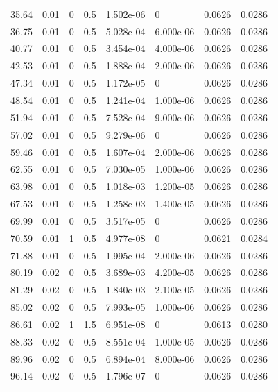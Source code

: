 \documentclass[preview]{standalone}
\begin{document}
{{\begin{tabular}{L{1.2cm}C{1.2cm} C{0.3cm}C{0.5cm} C{1.4cm}C{1.4cm} C{1.4cm}C{1.4cm}}
  35.64  &  0.01  & 0     & 0.5 &  1.502e-06  & 0  & 0.0626 &  0.0286   \\ 
  36.75  &  0.01  & 0     & 0.5 &  5.028e-04  & 6.000e-06  & 0.0626 &  0.0286   \\ 
  40.77  &  0.01  & 0     & 0.5 &  3.454e-04  & 4.000e-06  & 0.0626 &  0.0286   \\ 
  42.53  &  0.01  & 0     & 0.5 &  1.888e-04  & 2.000e-06  & 0.0626 &  0.0286   \\ 
  47.34  &  0.01  & 0     & 0.5 &  1.172e-05  & 0  & 0.0626 &  0.0286   \\ 
  48.54  &  0.01  & 0     & 0.5 &  1.241e-04  & 1.000e-06  & 0.0626 &  0.0286   \\ 
  51.94  &  0.01  & 0     & 0.5 &  7.528e-04  & 9.000e-06  & 0.0626 &  0.0286   \\ 
  57.02  &  0.01  & 0     & 0.5 &  9.279e-06  & 0  & 0.0626 &  0.0286   \\ 
  59.46  &  0.01  & 0     & 0.5 &  1.607e-04  & 2.000e-06  & 0.0626 &  0.0286   \\ 
  62.55  &  0.01  & 0     & 0.5 &  7.030e-05  & 1.000e-06  & 0.0626 &  0.0286   \\ 
  63.98  &  0.01  & 0     & 0.5 &  1.018e-03  & 1.200e-05  & 0.0626 &  0.0286   \\ 
  67.53  &  0.01  & 0     & 0.5 &  1.258e-03  & 1.400e-05  & 0.0626 &  0.0286   \\ 
  69.99  &  0.01  & 0     & 0.5 &  3.517e-05  & 0  & 0.0626 &  0.0286   \\ 
  70.59  &  0.01  & 1     & 0.5 &  4.977e-08  & 0  & 0.0621 &  0.0284   \\ 
  71.88  &  0.01  & 0     & 0.5 &  1.995e-04  & 2.000e-06  & 0.0626 &  0.0286   \\ 
  80.19  &  0.02  & 0     & 0.5 &  3.689e-03  & 4.200e-05  & 0.0626 &  0.0286   \\ 
  81.29  &  0.02  & 0     & 0.5 &  1.840e-03  & 2.100e-05  & 0.0626 &  0.0286   \\ 
  85.02  &  0.02  & 0     & 0.5 &  7.993e-05  & 1.000e-06  & 0.0626 &  0.0286   \\ 
  86.61  &  0.02  & 1     & 1.5 &  6.951e-08  & 0  & 0.0613 &  0.0280   \\ 
  88.33  &  0.02  & 0     & 0.5 &  8.551e-04  & 1.000e-05  & 0.0626 &  0.0286   \\ 
  89.96  &  0.02  & 0     & 0.5 &  6.894e-04  & 8.000e-06  & 0.0626 &  0.0286   \\ 
  96.14  &  0.02  & 0     & 0.5 &  1.796e-07  & 0  & 0.0626 &  0.0286   \\ 

\end{tabular}}}
\end{document}
